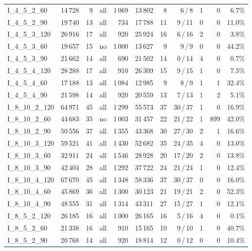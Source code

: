 \begin{table}[!htbp]
{\begin{tabular}{lrrrrrrrrrr}
I\_4\_5\_2\_60 & 14\,728 & 9 & all & 1\,069 & 13\,802 & 8 & 6\,/\,8 & 1 & 0 & 6.7\% \\
I\_4\_5\_2\_90 & 19\,740 & 13 & all & 734 & 17\,788 & 11 & 9\,/\,11 & 0 & 0 & 11.0\% \\
I\_4\_5\_3\_120 & 26\,916 & 17 & all & 920 & 25\,924 & 16 & 6\,/\,16 & 2 & 0 & 3.8\% \\
I\_4\_5\_3\_60 & 19\,657 & 15 & no & 1\,000 & 13\,627 & 9 & 9\,/\,9 & 0 & 0 & 44.2\% \\
I\_4\_5\_3\_90 & 21\,662 & 14 & all & 690 & 21\,502 & 14 & 0\,/\,14 & 4 & 0 & 0.7\% \\
I\_4\_5\_4\_120 & 28\,288 & 17 & all & 910 & 26\,309 & 15 & 9\,/\,15 & 1 & 0 & 7.5\% \\
I\_4\_5\_4\_60 & 17\,188 & 13 & all & 1\,084 & 12\,985 & 9 & 8\,/\,9 & 1 & 1 & 32.4\% \\
I\_4\_5\_4\_90 & 21\,598 & 14 & all & 920 & 20\,559 & 13 & 7\,/\,13 & 1 & 2 & 5.1\% \\
I\_8\_10\_2\_120 & 64\,971 & 45 & all & 1\,299 & 55\,573 & 37 & 30\,/\,37 & 1 & 0 & 16.9\% \\
I\_8\_10\_2\_60 & 44\,683 & 35 & no & 1\,003 & 31\,457 & 22 & 21\,/\,22 & 1 & 899 & 42.0\% \\
I\_8\_10\_2\_90 & 50\,556 & 37 & all & 1\,355 & 43\,368 & 30 & 27\,/\,30 & 2 & 1 & 16.6\% \\
I\_8\_10\_3\_120 & 59\,521 & 41 & all & 1\,430 & 52\,682 & 35 & 24\,/\,35 & 4 & 0 & 13.0\% \\
I\_8\_10\_3\_60 & 32\,911 & 24 & all & 1\,546 & 28\,928 & 20 & 17\,/\,20 & 2 & 0 & 13.8\% \\
I\_8\_10\_3\_90 & 42\,404 & 28 & all & 1\,292 & 37\,722 & 24 & 21\,/\,24 & 1 & 0 & 12.4\% \\
I\_8\_10\_4\_120 & 67\,670 & 45 & all & 1\,348 & 58\,336 & 37 & 30\,/\,37 & 0 & 0 & 16.0\% \\
I\_8\_10\_4\_60 & 45\,869 & 36 & all & 1\,300 & 30\,123 & 21 & 19\,/\,21 & 2 & 0 & 52.3\% \\
I\_8\_10\_4\_90 & 48\,555 & 31 & all & 1\,314 & 43\,311 & 27 & 15\,/\,27 & 1 & 0 & 12.1\% \\
I\_8\_5\_2\_120 & 26\,185 & 16 & all & 1\,000 & 26\,165 & 16 & 5\,/\,16 & 4 & 0 & 0.1\% \\
I\_8\_5\_2\_60 & 21\,338 & 16 & all & 910 & 15\,165 & 10 & 9\,/\,10 & 1 & 0 & 40.7\% \\
I\_8\_5\_2\_90 & 20\,768 & 14 & all & 920 & 18\,814 & 12 & 0\,/\,12 & 0 & 0 & 10.4\% \\

\end{tabular}}
\end{table}
